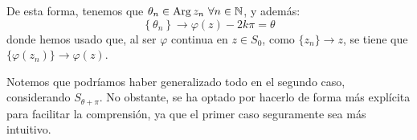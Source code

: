 \begin{ejercicio}
\begin{itemize}
        De esta forma, tenemos que $\theta_n\in \operatorname{Arg} z_n~\forall n\in \mathbb{N}$, y además:
        \begin{equation*}
            \left\{\theta_n\right\} \to \varphi(z)-2k\pi = \theta
        \end{equation*}
        donde hemos usado que, al ser $\varphi$ continua en $z\in S_0$, como $\{z_n\}\to z$, se tiene que $\{\varphi(z_n)\}\to \varphi(z)$.
    \end{itemize}
    \begin{observacion}
        Notemos que podríamos haber generalizado todo en el segundo caso, considerando $S_{\theta+\pi}$. No obstante, se ha optado por hacerlo de forma más explícita para facilitar la comprensión, ya que el primer caso seguramente sea más intuitivo.
    \end{observacion}

\end{ejercicio}

